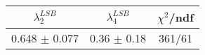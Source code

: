 \begin{tabular}{c|c||c}
$\lambda_{2}^{LSB}$ & $\lambda_4^{LSB}$ & $\chi^{2}$/ndf \\
\hline
0.648 $\pm$ 0.077 & 0.36 $\pm$ 0.18 & 361/61\\
\end{tabular}
